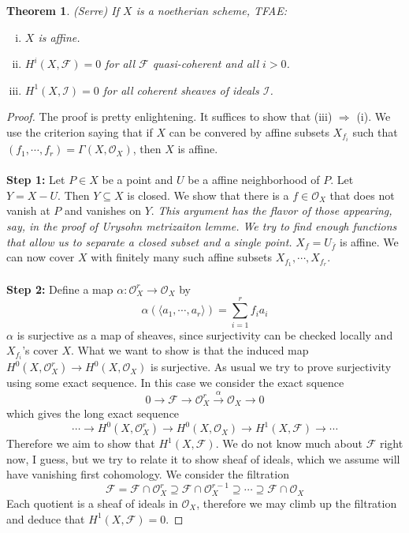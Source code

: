 \documentclass[12pt]{article}
\theoremstyle{plain}
\newtheorem{theorem}[equation]{Theorem}
\theoremstyle{definition}
\newcommand{\sO}{\mathcal{O}}
\newcommand{\shF}{\mathscr{F}}
\newcommand{\shI}{\mathscr{I}}
\newcommand{\<}{\langle}
\renewcommand{\>}{\rangle}
\begin{document}
\begin{theorem}
\emph{(Serre)} If $X$ is a noetherian scheme, TFAE:
\begin{enumerate}[(i)]
\item $X$ is affine.
\item $H^i(X, \shF) = 0$ for all $\shF$ quasi-coherent and all $i > 0$. 
\item $H^1(X, \shI) = 0$ for all coherent sheaves of ideals $\shI$.
\end{enumerate}
\end{theorem}
\begin{proof}
The proof is pretty enlightening. It suffices to show that (iii) $\Rightarrow$ (i). We use the criterion saying that if $X$ can be convered by affine subsets $X_{f_i}$ such that $(f_1, \cdots, f_r) = \Gamma(X, \sO_X)$, then $X$ is affine. \\\\
\textbf{Step 1:} Let $P \in X$ be a point and $U$ be a affine neighborhood of $P$. Let $Y = X - U$. Then $Y \subseteq X$ is closed. We show that there is a $f \in \sO_X$ that does not vanish at $P$ and vanishes on $Y$. \textit{This argument has the flavor of those appearing, say, in the proof of Urysohn metrizaiton lemme. We try to find enough functions that allow us to separate a closed subset and a single point.} $X_f = U_{\bar{f}}$ is affine. We can now cover $X$ with finitely many such affine subsets $X_{f_1}, \cdots, X_{f_r}$. \\\\
\textbf{Step 2:} Define a map $\alpha : \sO_X^r \to \sO_X$ by 
$$ \alpha(\< a_1, \cdots, a_r \>) = \sum_{i = 1}^r f_i a_i $$ 
$\alpha$ is surjective as a map of sheaves, since surjectivity can be checked locally and $X_{f_i}$'s cover $X$. What we want to show is that the induced map $H^0(X, \sO_X^r) \to H^0(X, \sO_X)$ is surjective. As usual we try to prove surjectivity using some exact sequence. In this case we consider the exact squence 
$$ 0 \to \shF \to \sO_X^r \stackrel{\alpha}{\to} \sO_X \to 0 $$
which gives the long exact sequence 
$$ \cdots \to H^0(X, \sO_X^r) \to H^0(X, \sO_X) \to H^1(X, \shF) \to \cdots $$
Therefore we aim to show that $H^1(X, \shF)$. We do not know much about $\shF$ right now, I guess, but we try to relate it to show sheaf of ideals, which we assume will have vanishing first cohomology. We consider the filtration 
$$ \shF = \shF \cap \sO_X^r \supseteq \shF \cap \sO_X^{r - 1} \supseteq \cdots \supseteq \shF \cap \sO_X $$
Each quotient is a sheaf of ideals in $\sO_X$, therefore we may climb up the filtration and deduce that $H^1(X, \shF) = 0$.  
\end{proof}
\end{document}
